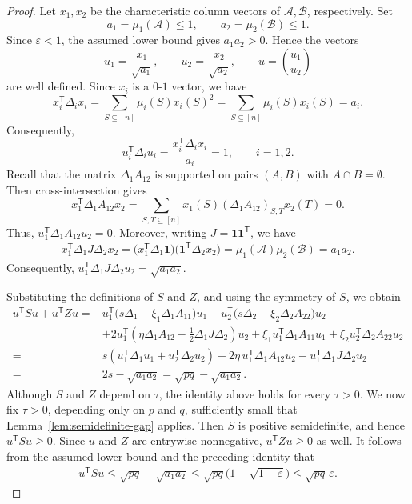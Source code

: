 \documentclass[11pt]{article}
\numberwithin{equation}{section}
\theoremstyle{definition}
\theoremstyle{remark}
\begin{document}
\begin{proof}
Let $x_1,x_2$ be the characteristic column vectors of
$\mathcal A,\mathcal B$, respectively. Set
$$
 a_1=\mu_1(\mathcal A)\leq 1,
 \qquad
 a_2=\mu_2(\mathcal B)\leq 1.
$$
Since
$\varepsilon<1$, the assumed lower bound gives
$a_1a_2>0$.  Hence the vectors
$$
 u_1=\frac{x_1}{\sqrt{a_1}},
 \qquad
 u_2=\frac{x_2}{\sqrt{a_2}},
 \qquad
 u=\binom{u_1}{u_2}
$$
are well defined.  Since  $x_i$ is a $0$-$1$ vector, we have
$$
 x_i^{\mathsf T}\Delta_i x_i
 =
 \sum_{S\subseteq[n]}\mu_i(S)x_i(S)^2
 =
 \sum_{S\subseteq[n]}\mu_i(S)x_i(S)
 =
 a_i.
$$
Consequently,
$$
 u_i^{\mathsf T}\Delta_i u_i
 =
 \frac{x_i^{\mathsf T}\Delta_i x_i}{a_i}
 =1,
 \qquad i=1,2.
$$
Recall that the matrix $\Delta_1A_{12}$ is supported on pairs
$(A,B)$ with $A\cap B=\emptyset$.  Then cross-intersection gives
$$
 x_1^{\mathsf T}\Delta_1A_{12}x_2
 =
 \sum_{S,T\subseteq[n]}
 x_1(S)(\Delta_1A_{12})_{S,T}x_2(T)=0.
$$
Thus, $u_1^{\mathsf T}\Delta_1A_{12}u_2=0$.
Moreover, writing $ J=\mathbf 1\mathbf 1^{\mathsf T}$, we have
$$
\begin{aligned}
 x_1^{\mathsf T}\Delta_1 J\Delta_2x_2
 =
 \bigl(x_1^{\mathsf T}\Delta_1\mathbf 1\bigr)
 \bigl(\mathbf 1^{\mathsf T}\Delta_2x_2\bigr)=
 \mu_1(\mathcal A)\mu_2(\mathcal B)
 =
 a_1a_2.
\end{aligned}
$$
Consequently,
$
 u_1^{\mathsf T}\Delta_1 J\Delta_2u_2
 =\sqrt{a_1a_2}.
$





Substituting the definitions of $S$ and $Z$, and using
the symmetry of $S$, we obtain
$$
\begin{aligned}
 u^{\mathsf T} S u+u^{\mathsf T}Z u
 =&
 u_1^{\mathsf T}
 \bigl(s\Delta_1-\xi_1\Delta_1A_{11}\bigr)u_1+
 u_2^{\mathsf T}
 \bigl(s\Delta_2-\xi_2\Delta_2A_{22}\bigr)u_2\\
 &+
 2u_1^{\mathsf T}
 \left(
  \eta\Delta_1A_{12}
  -\frac12\Delta_1 J\Delta_2
 \right)u_2+
 \xi_1u_1^{\mathsf T}\Delta_1A_{11}u_1
 +
 \xi_2u_2^{\mathsf T}\Delta_2A_{22}u_2\\
 =&
 s\left(
  u_1^{\mathsf T}\Delta_1u_1
  +u_2^{\mathsf T}\Delta_2u_2
 \right)
 +
 2\eta\,u_1^{\mathsf T}\Delta_1A_{12}u_2-
 u_1^{\mathsf T}\Delta_1 J\Delta_2u_2\\
 =&
 2s-\sqrt{a_1a_2}=
 \sqrt{pq}-\sqrt{a_1a_2}.
\end{aligned}
$$
Although $S$ and $ Z$ depend on $\tau$, the identity
above holds for every $\tau>0$. We now fix $\tau>0$, depending only on $p$ and
$q$, sufficiently small that Lemma~\ref{lem:semidefinite-gap}
applies. Then $ S$ is positive semidefinite, and hence
$u^{\mathsf T} S u\geq0$.  
Since $u$ and
$ Z$ are entrywise nonnegative,
$u^{\mathsf T} Z u\geq0$ as well.  It follows from
the assumed lower bound and the preceding identity that
$$
\begin{aligned}
 u^{\mathsf T} S u
 \leq
 \sqrt{pq}-\sqrt{a_1a_2}\leq
 \sqrt{pq}\bigl(1-\sqrt{1-\varepsilon}\bigr)
 \leq
 \sqrt{pq}\,\varepsilon.
\end{aligned}
$$


\end{proof}
\end{document}
